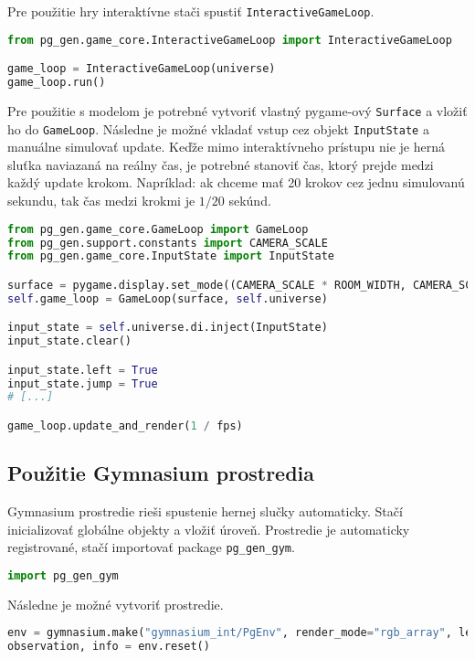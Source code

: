 Pre použitie hry interaktívne stači spustiť \texttt{InteractiveGameLoop}.

\begin{lstlisting}[language=python]
from pg_gen.game_core.InteractiveGameLoop import InteractiveGameLoop

game_loop = InteractiveGameLoop(universe)
game_loop.run()
\end{lstlisting}

Pre použitie s modelom je potrebné vytvoriť vlastný pygame-ový \texttt{Surface} a vložiť ho do \texttt{GameLoop}. Následne je možné vkladať vstup cez objekt \texttt{InputState} a manuálne simulovať update. Keďže mimo interaktívneho prístupu nie je herná sluťka naviazaná na reálny čas, je potrebné stanoviť čas, ktorý prejde medzi každý update krokom. Napríklad: ak chceme mať 20 krokov cez jednu simulovanú sekundu, tak čas medzi krokmi je $ 1 / 20 $ sekúnd.

\begin{lstlisting}[language=python]
from pg_gen.game_core.GameLoop import GameLoop
from pg_gen.support.constants import CAMERA_SCALE
from pg_gen.game_core.InputState import InputState

surface = pygame.display.set_mode((CAMERA_SCALE * ROOM_WIDTH, CAMERA_SCALE * ROOM_HEIGHT))
self.game_loop = GameLoop(surface, self.universe)

input_state = self.universe.di.inject(InputState)
input_state.clear()

input_state.left = True
input_state.jump = True
# [...]

game_loop.update_and_render(1 / fps)
\end{lstlisting}

\subsection*{Použitie Gymnasium prostredia}

Gymnasium prostredie rieši spustenie hernej slučky automaticky. Stačí inicializovať globálne objekty a vložiť úroveň. Prostredie je automaticky registrované, stačí importovať package \texttt{pg\_gen\_gym}.

\begin{lstlisting}[language=python]
import pg_gen_gym
\end{lstlisting}

Následne je možné vytvoriť prostredie.

\begin{lstlisting}[language=python]
env = gymnasium.make("gymnasium_int/PgEnv", render_mode="rgb_array", level=level)
observation, info = env.reset()
\end{lstlisting}

